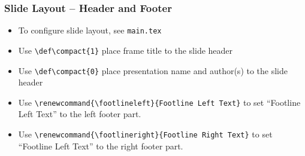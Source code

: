 
\begin{frame}
    \frametitle{Slide Layout -- Header and Footer}
    \begin{itemize}
        \item To configure slide layout, see {\tt main.tex}
        \item Use {\tt \textbackslash def\textbackslash compact\{1\}} place frame title to the slide header
        \item Use {\tt \textbackslash def\textbackslash compact\{0\}} place presentation name and author(s) to the slide header
        \item Use {\tt \textbackslash renewcommand\{\textbackslash footlineleft\}\{Footline Left Text\}}  to set ``Footline Left Text'' to the left footer part.
        \item Use {\tt \textbackslash renewcommand\{\textbackslash footlineright\}\{Footline Right Text\}}  to set ``Footline Left Text'' to the right footer part.
    \end{itemize}    
\end{frame}

